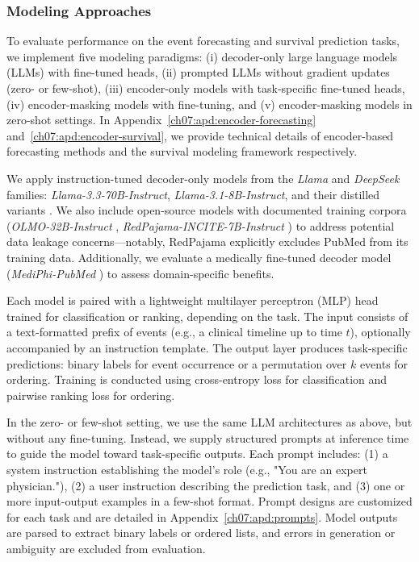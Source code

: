 \subsubsection{Modeling Approaches}
To evaluate performance on the event forecasting and survival prediction tasks, we implement five modeling paradigms: (i) decoder-only large language models (LLMs) with fine-tuned heads, (ii) prompted LLMs without gradient updates (zero- or few-shot), (iii) encoder-only models with task-specific fine-tuned heads, (iv) encoder-masking models with fine-tuning, and (v) encoder-masking models in zero-shot settings.
In Appendix~\ref{ch07:apd:encoder-forecasting} and~\ref{ch07:apd:encoder-survival}, we provide technical details of encoder-based forecasting methods and the survival modeling framework respectively.

We apply instruction-tuned decoder-only models from the \textit{Llama} and \textit{DeepSeek} families: \textit{Llama-3.3-70B-Instruct}, \textit{Llama-3.1-8B-Instruct}, and their distilled variants \citep{grattafiori2024llama,liu2024deepseek}.
We also include open-source models with documented training corpora (\textit{OLMO-32B-Instruct} \citep{olmo20242}, \textit{RedPajama-INCITE-7B-Instruct} \citep{weber2024redpajama}) to address potential data leakage concerns---notably, RedPajama explicitly excludes PubMed from its training data.
Additionally, we evaluate a medically fine-tuned decoder model (\textit{MediPhi-PubMed} \citep{corbeil2025modular}) to assess domain-specific benefits.

Each model is paired with a lightweight multilayer perceptron (MLP) head trained for classification or ranking, depending on the task. 
The input consists of a text-formatted prefix of events (e.g., a clinical timeline up to time $t$), optionally accompanied by an instruction template. 
The output layer produces task-specific predictions: binary labels for event occurrence or a permutation over $k$ events for ordering. 
Training is conducted using cross-entropy loss for classification and pairwise ranking loss for ordering.

In the zero- or few-shot setting, we use the same LLM architectures as above, but without any fine-tuning. 
Instead, we supply structured prompts at inference time to guide the model toward task-specific outputs. 
Each prompt includes: 
(1) a system instruction establishing the model’s role (e.g., "You are an expert physician."), 
(2) a user instruction describing the prediction task, and 
(3) one or more input-output examples in a few-shot format.
Prompt designs are customized for each task and are detailed in Appendix~\ref{ch07:apd:prompts}.
Model outputs are parsed to extract binary labels or ordered lists, and errors in generation or ambiguity are excluded from evaluation.

